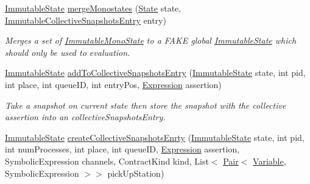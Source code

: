 \begin{DoxyCompactItemize}
\hyperlink{classedu_1_1udel_1_1cis_1_1vsl_1_1civl_1_1state_1_1common_1_1immutable_1_1ImmutableState}{Immutable\+State} \hyperlink{classedu_1_1udel_1_1cis_1_1vsl_1_1civl_1_1state_1_1common_1_1immutable_1_1ImmutableStateFactory_a450c5462e9b7f8eaad36a3d4bbd744d0}{merge\+Monostates} (\hyperlink{interfaceedu_1_1udel_1_1cis_1_1vsl_1_1civl_1_1state_1_1IF_1_1State}{State} state, \hyperlink{classedu_1_1udel_1_1cis_1_1vsl_1_1civl_1_1state_1_1common_1_1immutable_1_1ImmutableCollectiveSnapshotsEntry}{Immutable\+Collective\+Snapshots\+Entry} entry)
\begin{DoxyCompactList}\small\item\em Merges a set of \hyperlink{classedu_1_1udel_1_1cis_1_1vsl_1_1civl_1_1state_1_1common_1_1immutable_1_1ImmutableMonoState}{Immutable\+Mono\+State} to a F\+A\+K\+E global \hyperlink{classedu_1_1udel_1_1cis_1_1vsl_1_1civl_1_1state_1_1common_1_1immutable_1_1ImmutableState}{Immutable\+State} which should only be used to evaluation. \end{DoxyCompactList}\item 
\hyperlink{classedu_1_1udel_1_1cis_1_1vsl_1_1civl_1_1state_1_1common_1_1immutable_1_1ImmutableState}{Immutable\+State} \hyperlink{classedu_1_1udel_1_1cis_1_1vsl_1_1civl_1_1state_1_1common_1_1immutable_1_1ImmutableStateFactory_ae7514e9e3d808ecf1b7f5b375cf5cf8f}{add\+To\+Collective\+Snapshots\+Entry} (\hyperlink{classedu_1_1udel_1_1cis_1_1vsl_1_1civl_1_1state_1_1common_1_1immutable_1_1ImmutableState}{Immutable\+State} state, int pid, int place, int queue\+I\+D, int entry\+Pos, \hyperlink{interfaceedu_1_1udel_1_1cis_1_1vsl_1_1civl_1_1model_1_1IF_1_1expression_1_1Expression}{Expression} assertion)
\begin{DoxyCompactList}\small\item\em Take a snapshot on current state then store the snapshot with the collective assertion into an collective\+Snapshots\+Entry. \end{DoxyCompactList}\item 
\hyperlink{classedu_1_1udel_1_1cis_1_1vsl_1_1civl_1_1state_1_1common_1_1immutable_1_1ImmutableState}{Immutable\+State} \hyperlink{classedu_1_1udel_1_1cis_1_1vsl_1_1civl_1_1state_1_1common_1_1immutable_1_1ImmutableStateFactory_a4462151d1c85d4d4a878d88d6cc96350}{create\+Collective\+Snapshots\+Enrty} (\hyperlink{classedu_1_1udel_1_1cis_1_1vsl_1_1civl_1_1state_1_1common_1_1immutable_1_1ImmutableState}{Immutable\+State} state, int pid, int num\+Processes, int place, int queue\+I\+D, \hyperlink{interfaceedu_1_1udel_1_1cis_1_1vsl_1_1civl_1_1model_1_1IF_1_1expression_1_1Expression}{Expression} assertion, Symbolic\+Expression channels, Contract\+Kind kind, List$<$ \hyperlink{classedu_1_1udel_1_1cis_1_1vsl_1_1civl_1_1util_1_1IF_1_1Pair}{Pair}$<$ \hyperlink{interfaceedu_1_1udel_1_1cis_1_1vsl_1_1civl_1_1model_1_1IF_1_1variable_1_1Variable}{Variable}, Symbolic\+Expression $>$$>$ pick\+Up\+Station)
$$
\end{DoxyCompactItemize}
